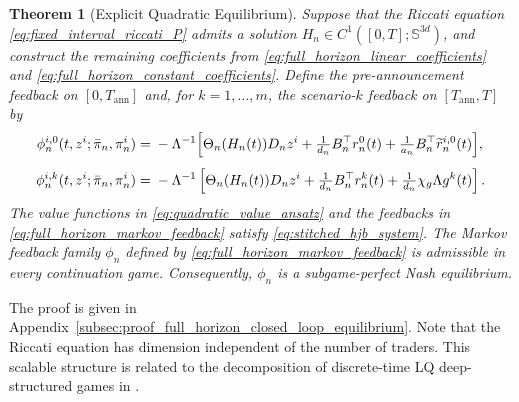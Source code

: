 \documentclass[12pt]{article}
\numberwithin{equation}{section}
\newtheorem{theorem}{Theorem}[section]
\theoremstyle{definition}
\begin{document}
\begin{theorem}[Explicit Quadratic Equilibrium]
\label{thm:full_horizon_closed_loop_equilibrium}
Suppose that the Riccati equation
\eqref{eq:fixed_interval_riccati_P} admits a solution
\(H_n\in C^1([0,T];\mathbb S^{3d})\), and construct the remaining
coefficients from \eqref{eq:full_horizon_linear_coefficients} and
\eqref{eq:full_horizon_constant_coefficients}. Define the pre-announcement
feedback on \([0,T_{\mathrm{ann}}]\) and, for \(k=1,\ldots,m\), the
scenario-\(k\) feedback on \([T_{\mathrm{ann}},T]\) by
\begin{equation}\label{eq:full_horizon_markov_feedback}
\begin{aligned}
\phi_n^{i,0}(t,z^i;\bar\pi_n,\pi_n^i)
={}&-\Lambda^{-1}\Bigl[
\Theta_n(H_n(t))D_nz^i
+\tfrac{1}{d_n}B_n^\top r_n^0(t)
+\tfrac{1}{a_n}B_n^\top\widetilde r_n^{i,0}(t)
\Bigr],\\[4pt]
\phi_n^{i,k}(t,z^i;\bar\pi_n,\pi_n^i)
={}&-\Lambda^{-1}\left[
\Theta_n(H_n(t))D_nz^i
+\tfrac{1}{d_n}
B_n^\top r_n^k(t)+\tfrac{1}{d_n}\chi_g\Lambda g^k(t)
\right].
\end{aligned}
\end{equation}
The value functions in \eqref{eq:quadratic_value_ansatz} and the feedbacks in
\eqref{eq:full_horizon_markov_feedback} satisfy
\eqref{eq:stitched_hjb_system}. The Markov feedback family \(\phi_n\) defined
by \eqref{eq:full_horizon_markov_feedback} is admissible in every continuation
game. Consequently, \(\phi_n\) is a subgame-perfect Nash equilibrium.
\end{theorem}

The proof is given in
Appendix~\ref{subsec:proof_full_horizon_closed_loop_equilibrium}.
Note that the Riccati equation has dimension independent of the number of traders. This
scalable structure is related to the decomposition of discrete-time LQ
deep-structured games in
\citet{arabneydi2020explicitsequentialequilibrialq}.
\end{document}
